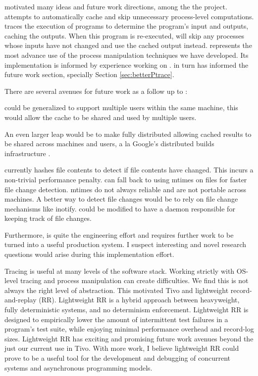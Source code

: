 \dettrace motivated many ideas and future work directions, among the the \pc{} project. \pc{} attempts to automatically cache and skip unnecessary process-level computations. \pc{} traces the execution of programs to determine the program's input and outputs, caching the outputs. When this program is re-executed, \pc{} will skip any processes whose inputs have not changed and use the cached output instead. \pc{} represents the most advance use of the process manipulation techniques we have developed. Its implementation is informed by experience working on \dettrace{}. \pc{} in turn has informed the future work section, specially Section \ref{sec:betterPtrace}.

There are several avenues for future work as a follow up to \pc{}:
\begin{compactitem}
  \item \pc{} could be generalized to support multiple users within the same machine, this would allow the cache to be shared and used by multiple users.
  \item An even larger leap would be to make \pc{} fully distributed allowing cached results to be shared across machines and users, a la Google's distributed builds infrastructure \cite{distributed-google}. 
  \item \pc{} currently hashes file contents to detect if file contents have changed. This incurs a non-trivial performance penalty. \pc{} can fall back to using mtimes on files for faster file change detection. mtimes do not always reliable and are not portable across machines. A better way to detect file changes would be to rely on file change mechanisms like inotify. \pc{} could be modified to have a daemon responsible for keeping track of file changes.
\end{compactitem}

  Furthermore, \pc{} is quite the engineering effort and requires further work to be turned into a useful production system. I suspect interesting and novel research questions would arise during this implementation effort.

Tracing is useful at many levels of the software stack. Working strictly with OS-level tracing and process manipulation can create difficulties. We find this is not always the right level of abstraction. This motivated Tivo and lightweight record-and-replay (RR). Lightweight RR is a hybrid approach between heavyweight, fully deterministic systems, and no determinism enforcement. Lightweight RR is designed to empirically lower the amount of intermittent test failures in a program's test suite, while enjoying minimal performance overhead and record-log sizes. Lightweight RR has exciting and promising future work avenues beyond the just our current use in Tivo. With more work, I believe lightweight RR could prove to be a useful tool for the development and debugging of concurrent systems and asynchronous programming models.

